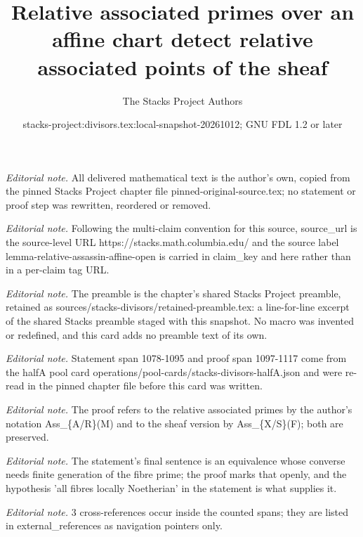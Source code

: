 \documentclass[10pt,a4paper]{amsart}
\title{Relative associated primes over an affine chart detect relative associated points of the sheaf}
\author{The Stacks Project Authors}
\date{stacks-project:divisors.tex:local-snapshot-20261012; GNU FDL 1.2 or later}
\theoremstyle{plain}
\theoremstyle{definition}
\theoremstyle{remark}
\numberwithin{equation}{subsection}
\begin{document}
\maketitle
\noindent\textit{Editorial note.} All delivered mathematical text is the author's own, copied from the pinned Stacks Project chapter file pinned-original-source.tex; no statement or proof step was rewritten, reordered or removed.\par\medskip
\noindent\textit{Editorial note.} Following the multi-claim convention for this source, source\_url is the source-level URL https://stacks.math.columbia.edu/ and the source label lemma-relative-assassin-affine-open is carried in claim\_key and here rather than in a per-claim tag URL.\par\medskip
\noindent\textit{Editorial note.} The preamble is the chapter's shared Stacks Project preamble, retained as sources/stacks-divisors/retained-preamble.tex: a line-for-line excerpt of the shared Stacks preamble staged with this snapshot. No macro was invented or redefined, and this card adds no preamble text of its own.\par\medskip
\noindent\textit{Editorial note.} Statement span 1078-1095 and proof span 1097-1117 come from the halfA pool card operations/pool-cards/stacks-divisors-halfA.json and were re-read in the pinned chapter file before this card was written.\par\medskip
\noindent\textit{Editorial note.} The proof refers to the relative associated primes by the author's notation Ass\_\{A/R\}(M) and to the sheaf version by Ass\_\{X/S\}(F); both are preserved.\par\medskip
\noindent\textit{Editorial note.} The statement's final sentence is an equivalence whose converse needs finite generation of the fibre prime; the proof marks that openly, and the hypothesis 'all fibres locally Noetherian' in the statement is what supplies it.\par\medskip
\noindent\textit{Editorial note.} 3 cross-references occur inside the counted spans; they are listed in external\_references as navigation pointers only.\par\medskip
\end{document}

